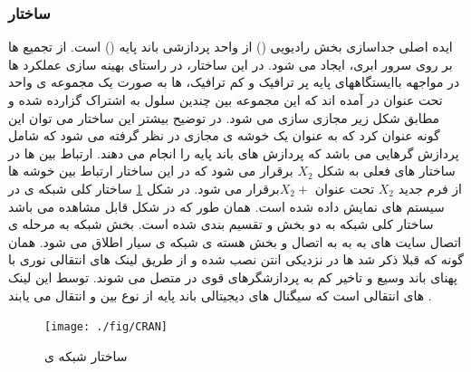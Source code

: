 \subsubsection{ساختار }




ایده اصلی  جداسازی بخش رادیویی () 
 از واحد پردازشی باند پایه ()
  است.
از تجمیع  ها بر روی سرور ابری،  ایجاد می شود.
در این ساختار، در راستای بهینه سازی عملکرد 
 ها در مواجهه باایستگاههای پایه پر ترافیک و کم ترافیک،
 ها به صورت یک مجموعه ی واحد تحت عنوان 
 در آمده اند که این مجموعه بین چندین سلول 
 به اشتراک گزارده شده و مطابق شکل زیر مجازی سازی
می شود. 
در توضیح بیشتر این ساختار می توان این گونه
عنوان کرد که  به عنوان یک خوشه ی مجازی
در نظر گرفته می شود که شامل پردازش گرهایی می باشد
که پردازش های باند پایه را انجام می دهند. ارتباط بین
  ها در ساختار های فعلی به شکل  $X_2$ برقرار می شود
که در این ساختار ارتباط بین خوشه ها از فرم جدید $X_2$
تحت عنوان  $X_2 +$برقرار می شود.
\newline
در شکل \ref{fig:C-RAN} ساختار کلی شبکه ی   در سیستم های
 نمایش داده شده است. همان طور که در شکل قابل
مشاهده می باشد ساختار کلی شبکه   به دو بخش
  و  تقسیم بندی شده است. بخش
 شبکه به مرحله ی اتصال سایت های به
 به  به اتصال  و بخش 
هسته ی شبکه ی سیار اطلاق می شود. همان گونه که قبلا
ذکر شد  ها در نزدیکی انتن نصب شده و از طریق
لینک های انتقالی نوری با پهنای باند وسیع و تاخیر کم به
پردازشگرهای قوی در  متصل می شوند. توسط این
لینک های انتقالی است که سیگنال های دیجیتالی باند
پایه از نوع  بین  و  انتقال می یابند \cite{checko2015cloud}.
\begin{figure}[H]
  \centering
    \texttt{[image: ./fig/CRAN]}
  \caption{ساختار شبکه ی  \cite{checko2015cloud}}
  \label{fig:C-RAN}
\end{figure}
